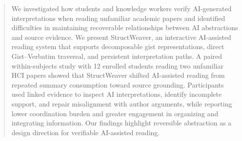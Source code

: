 \documentclass[manuscript,review,anonymous]{acmart}
\begin{document}


\begin{abstract}
We investigated how students and knowledge workers verify AI-generated interpretations when reading unfamiliar academic papers and identified difficulties in maintaining recoverable relationships between AI abstractions and source evidence. We present StructWeaver, an interactive AI-assisted reading system that supports decomposable gist representations, direct Gist--Verbatim traversal, and persistent interpretation paths. A paired within-subjects study with 12 enrolled students reading two unfamiliar HCI papers showed that StructWeaver shifted AI-assisted reading from repeated summary consumption toward source grounding. Participants used linked evidence to inspect AI interpretations, identify incomplete support, and repair misalignment with author arguments, while reporting lower coordination burden and greater engagement in organizing and integrating information. Our findings highlight reversible abstraction as a design direction for verifiable AI-assisted reading.
\end{abstract}


\end{document}
